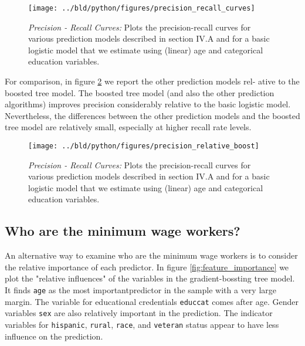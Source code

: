 \documentclass[11pt, a4paper, leqno]{article}
\begin{document}
\begin{figure}[H]

    \centering
    \texttt{[image: ../bld/python/figures/precision\_recall\_curves]}

    \caption{\emph{Precision - Recall Curves:} Plots the precision-recall curves for various
    prediction models described in section IV.A and for a basic logistic model that we
    estimate using (linear) age and categorical education variables. }
    \label{fig:precision-recall}

\end{figure}

For comparison, in ﬁgure \ref{fig:precision-relative} we report the other prediction models rel-
ative to the boosted tree model. The boosted tree model (and also the other
prediction algorithms) improves precision considerably relative to the basic
logistic model. Nevertheless, the differences between the other prediction
models and the boosted tree model are relatively small, especially at higher
recall rate levels. 

\begin{figure}[H]
    \centering
    \texttt{[image: ../bld/python/figures/precision\_relative\_boost]}
    \caption{\emph{Precision - Recall Curves:} Plots the precision-recall curves for various
    prediction models described in section IV.A and for a basic logistic model that we
    estimate using (linear) age and categorical education variables. }
    \label{fig:precision-relative}

\end{figure}


\subsection{Who are the minimum wage workers?}

An alternative way to examine who are the minimum wage workers is to consider 
the relative importance of each predictor. In ﬁgure \ref{fig:feature_importance} 
we plot the "relative
inﬂuences" of the variables in the gradient-bossting tree model. 
It ﬁnds \texttt{age} as the most importantpredictor in the sample with a very large margin.
The variable for educational credentials \texttt{educcat} comes after age. Gender variables \texttt{sex} are also relatively important
in the prediction. The indicator variables for \texttt{hispanic}, \texttt{rural}, \texttt{race}, and
\texttt{veteran} status appear to have less inﬂuence on the prediction.
\end{document}
